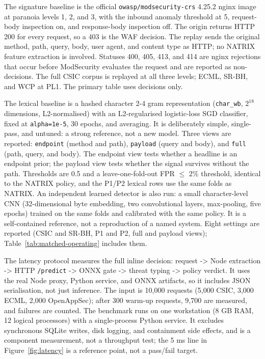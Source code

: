 \documentclass[preprint,11pt]{elsarticle}
\begin{document}
The signature baseline is the official \texttt{owasp/\allowbreak{}modsecurity-crs}
4.25.2 nginx image at paranoia levels 1, 2, and 3, with the inbound
anomaly threshold at 5, request-body inspection on, and response-body
inspection off. The origin returns HTTP 200 for every request, so a 403
is the WAF decision. The replay sends the original method, path, query,
body, user agent, and content type as HTTP; no NATRIX feature extraction
is involved. Statuses 400, 405, 413, and 414 are nginx rejections that
occur before ModSecurity evaluates the request and are reported as
non-decisions. The full CSIC corpus is replayed at all three levels;
ECML, SR-BH, and WCP at PL1. The primary table uses decisions only.

The lexical baseline is a hashed character 2-4 gram representation
(\texttt{char\_\allowbreak{}wb}, \(2^{18}\) dimensions, L2-normalised) with an
L2-regularised logistic-loss SGD classifier, fixed at
\texttt{alpha=1e-5}, 30 epochs, and averaging. It is deliberately
simple, single-pass, and untuned: a strong reference, not a new model.
Three views are reported: \texttt{endpoint} (method and path),
\texttt{payload} (query and body), and \texttt{full} (path, query, and
body). The endpoint view tests whether a headline is an endpoint prior;
the payload view tests whether the signal survives without the path.
Thresholds are 0.5 and a leave-one-fold-out FPR $\le$ 2\%
threshold, identical to the NATRIX policy, and the P1/P2 lexical rows
use the same folds as NATRIX. An independent learned detector is also
run: a small character-level CNN (32-dimensional byte embedding, two
convolutional layers, max-pooling, five epochs) trained on the same
folds and calibrated with the same policy. It is a self-contained
reference, not a reproduction of a named system. Eight settings are
reported (CSIC and SR-BH, P1 and P2, full and payload views); Table~\ref{tab:matched-operating}
includes them.

The latency protocol measures the full inline decision: request
-\textgreater{} Node extraction -\textgreater{} HTTP \texttt{/\allowbreak{}predict}
-\textgreater{} ONNX gate -\textgreater{} threat typing -\textgreater{}
policy verdict. It uses the real Node proxy, Python service, and ONNX
artifacts, so it includes JSON serialisation, not just inference. The
input is 10,000 requests (5,000 CSIC, 3,000 ECML, 2,000 OpenAppSec);
after 300 warm-up requests, 9,700 are measured, and failures are
counted. The benchmark runs on one workstation (8 GB RAM, 12 logical
processors) with a single-process Python service. It excludes
synchronous SQLite writes, disk logging, and containment side effects,
and is a component measurement, not a throughput test; the 5 ms line in
Figure~\ref{fig:latency} is a reference point, not a pass/fail target.
\end{document}
